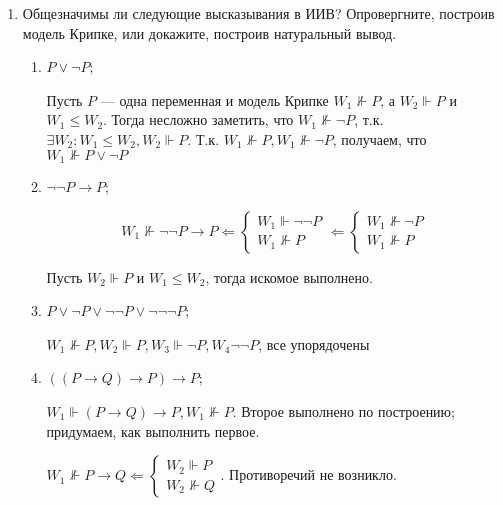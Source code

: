 \begin{enumerate}[wide, labelwidth=!, labelindent=0pt]
    \item Общезначимы ли следующие высказывания в ИИВ? Опровергните, построив модель Крипке, или докажите, построив натуральный вывод.
          \begin{enumerate}[wide, labelwidth=!, labelindent=0pt]
              \item $P \vee \neg P$;

                    Пусть \(P\) --- одна переменная и модель Крипке \(W_1 \nVdash P\), а \(W_2 \Vdash P\) и \(W_1 \leq W_2\). Тогда несложно заметить, что \(W_1 \nVdash \neg P\), т.к. \(\exists W_2 : W_1 \leq W_2, W_2 \Vdash P\). Т.к. \(W_1 \nVdash P, W_1 \nVdash \neg P\), получаем, что \(W_1 \nVdash P \lor \neg P\)

              \item $\neg\neg P \rightarrow P$;

                    \[W_1 \nVdash \neg\neg P \rightarrow P \Leftarrow \begin{cases}
                            W_1 \Vdash \neg \neg P \\
                            W_1 \nVdash P
                        \end{cases} \Leftarrow \begin{cases}
                            W_1 \nVdash \neg P \\
                            W_1 \nVdash P
                        \end{cases}\]

                    Пусть \(W_2 \Vdash P\) и \(W_1 \leq W_2\), тогда искомое выполнено.

              \item $P \vee \neg P \vee \neg\neg P \vee \neg\neg\neg P$;

                    \(W_1 \nVdash P, W_2 \Vdash P, W_3 \Vdash \neg P, W_4 \neg \neg P\), все упорядочены

              \item $((P \rightarrow Q) \rightarrow P) \rightarrow P$;

                    \(W_1 \Vdash (P \to Q) \to P, W_1 \nVdash P\). Второе выполнено по построению; придумаем, как выполнить первое.

                    \(W_1 \nVdash P \to Q \Leftarrow \begin{cases}
                        W_2 \Vdash P \\
                        W_2 \nVdash Q
                    \end{cases}\). Противоречий не возникло.


\end{enumerate}
\end{enumerate}
